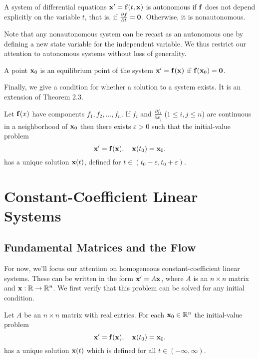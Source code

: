\documentclass[../m082main.tex]{subfiles}
\begin{document}
\begin{definition}
    A system of differential equations $\mathbf{x}' = \mathbf{f}(t, \mathbf{x})$ is autonomous if $\mathbf{f}$ does not depend explicitly on the variable $t$, that is, if $\frac{\partial f}{\partial t} = \mathbf{0}$.
    Otherwise, it is nonautonomous.
\end{definition}

Note that any nonautonomous system can be recast as an autonomous one by defining a new state variable for the independent variable.
We thus restrict our attention to autonomous systems without loss of generality.

\begin{definition}
    A point $\mathbf{x}_0$ is an equilibrium point of the system $\mathbf{x}' = \mathbf{f}(\mathbf{x})$ if $\mathbf{f}(\mathbf{x}_0) = \mathbf{0}$.
\end{definition}

Finally, we give a condition for whether a solution to a system exists.
It is an extension of Theorem 2.3.

\begin{theorem}
    Let $\mathbf{f}(x)$ have components $f_1, f_2, \ldots, f_n$.
    If $f_i$ and $\frac{\partial f_i}{\partial x_j}$ ($1 \leq i,j \leq n$) are continuous in a neighborhood of $\mathbf{x}_0$ then there exists $\varepsilon > 0$ such that the initial-value problem
    \[ \mathbf{x}' = \mathbf{f}(\mathbf{x}), \quad \mathbf{x}(t_0) = \mathbf{x}_0. \]
    has a unique solution $\mathbf{x}(t)$, defined for $t \in (t_0 - \varepsilon, t_0 + \varepsilon)$.
\end{theorem}

\section{Constant-Coefficient Linear Systems}
\subsection{Fundamental Matrices and the Flow}
For now, we'll focus our attention on homogeneous constant-coefficient linear systems.
These can be written in the form $\mathbf{x}' = A \mathbf{x}$, where $A$ is an $n \times n$ matrix and $\mathbf{x} : \mathbb{R} \to \mathbb{R}^n$.
We first verify that this problem can be solved for any initial condition.

\begin{theorem}
    Let $A$ be an $n \times n$ matrix with real entries.
    For each $\mathbf{x}_0 \in \mathbb{R}^n$ the initial-value problem
    \[ \mathbf{x}' = \mathbf{f}(\mathbf{x}), \quad \mathbf{x}(t_0) = \mathbf{x}_0. \]
    has a unique solution $\mathbf{x}(t)$ which is defined for all $t \in (-\infty, \infty)$.
\end{theorem}
\end{document}

